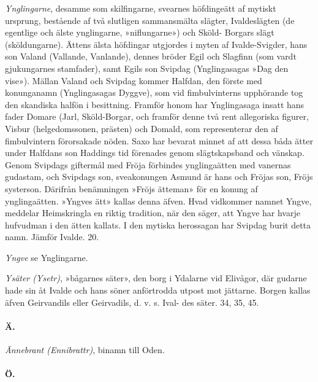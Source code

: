 \emph{Ynglingarne}, desamme som skilfingarne, svearnes höfdingeätt af
mytiskt ursprung, bestående af två slutligen sammansmälta slägter,
Ivaldeslägten (de egentlige och älste ynglingarne, »niflungarne») och
Sköld- Borgars slägt (sköldungarne). Ättens älsta höfdingar utgjordes i
myten af Ivalde-Svigder, hans son Valand (Vallande, Vanlande), dennes
bröder Egil och Slagfinn (som vardt gjukungarnes stamfader), samt Egils
son Svipdag (Ynglingasagas »Dag den vise»). Mällan Valand och Svipdag
kommer Halfdan, den förste med konunganamn (Ynglingasagas Dyggve), som
vid fimbulvinterns upphörande tog den skandiska halfön i besittning.
Framför honom har Ynglingasaga insatt hans fader Domare (Jarl,
Sköld-Borgar, och framför denne två rent allegoriska figurer, Visbur
(helgedomssonen, prästen) och Domald, som representerar den af
fimbulvintern förorsakade nöden. Saxo har bevarat minnet af att dessa
båda ätter under Halfdans son Haddings tid förenades genom
slägtskapsband och vänskap. Genom Svipdags giftermål med Fröja förbindes
ynglingaätten med vanernas gudastam, och Svipdags son, sveakonungen
Asmund är hans och Fröjas son, Fröjs systerson. Därifrån benämningen
»Fröjs ätteman» för en konung af ynglingaätten. »Yngves ätt» kallas
denna äfven. Hvad vidkommer namnet Yngve, meddelar Heimskringla en
riktig tradition, när den säger, att Yngve har hvarje hufvudman i den
ätten kallats. I den mytiska herossagan har Svipdag burit detta namn.
Jämför Ivalde. 20.

\emph{Yngve} se Ynglingarne.

\emph{Ysäter (Ysetr)}, »bågarnes säter», den borg i Ydalarne vid
Elivågor, där gudarne hade sin åt Ivalde och hans söner anförtrodda
utpost mot jättarne. Borgen kallas äfven Geirvandils eller Geirvadils,
d. v. s. Ival- des säter. 34, 35, 45.

\protect\hypertarget{lb1625905.xhtmlux5cux23start248}{}{}\protect\hypertarget{lb1625905.xhtmlux5cux23start248-a}{}{}\protect\hypertarget{lb1625905.xhtmlux5cux23start248-b}{}{}\protect\hypertarget{lb1625905.xhtmlux5cux23start248-c}{}{}\protect\hypertarget{lb1625905.xhtmlux5cux23start248-d}{}{}

\paragraph{Ä.}

\emph{Ännebrant (Ennibrattr)}, binamn till Oden.

\paragraph{Ö.}

